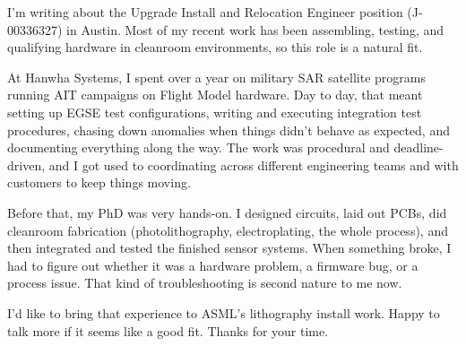 \documentclass[letterpaper,11pt]{moderncv}
\date{\today}
\begin{document}
\makelettertitle

I'm writing about the Upgrade Install and Relocation Engineer position (J-00336327) in Austin. Most of my recent work has been assembling, testing, and qualifying hardware in cleanroom environments, so this role is a natural fit.

At Hanwha Systems, I spent over a year on military SAR satellite programs running AIT campaigns on Flight Model hardware. Day to day, that meant setting up EGSE test configurations, writing and executing integration test procedures, chasing down anomalies when things didn't behave as expected, and documenting everything along the way. The work was procedural and deadline-driven, and I got used to coordinating across different engineering teams and with customers to keep things moving.

Before that, my PhD was very hands-on. I designed circuits, laid out PCBs, did cleanroom fabrication (photolithography, electroplating, the whole process), and then integrated and tested the finished sensor systems. When something broke, I had to figure out whether it was a hardware problem, a firmware bug, or a process issue. That kind of troubleshooting is second nature to me now.

I'd like to bring that experience to ASML's lithography install work. Happy to talk more if it seems like a good fit. Thanks for your time.

\makeletterclosing
\end{document}
